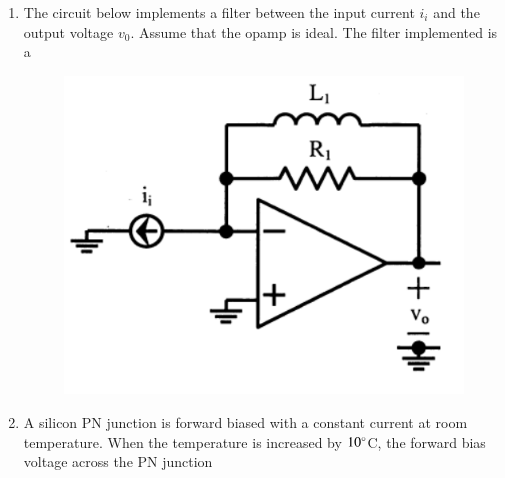 \documentclass[a4paper, 11pt]{article}
\begin{document}
\begin{enumerate}
    \begin{enumerate}
    \end{enumerate}

    \hfill{}

    \item The circuit below implements a filter between the input current $i_{i}$ and the output voltage $v_{0}$. Assume that the opamp is ideal. The filter implemented is a
    
    \begin{figure}[H]
        \centering
        \includegraphics[width=0.6\columnwidth]{figs/q8.png}
        \caption*{}
        \label{fig:q8}
    \end{figure}
    
    \begin{enumerate}
    \end{enumerate}

    \hfill{}

    \item A silicon PN junction is forward biased with a constant current at room temperature. When the temperature is increased by $10\degree$C, the forward bias voltage across the PN junction
    

\end{enumerate}
\end{document}
